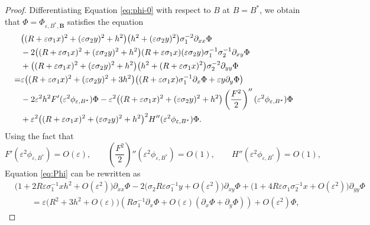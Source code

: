 \documentclass[12pt,reqno]{amsart}
\numberwithin{equation}{section}
\theoremstyle{definition}
\theoremstyle{remark}
\begin{document}
\begin{proof}
 

Differentiating Equation \eqref{eq:phi-0}  with respect to $ B $ at $ B = B^* $, we obtain that
$ \Phi=\Phi_{\varepsilon,B^*,\mathbf{B}} $ satisfies the equation 
 \begin{align}\label{eq:Phi}
 &\bigl((R+\varepsilon\sigma_1x)^2+(\varepsilon\sigma_2y)^2+h^2\bigr)\bigl(h^2+(\varepsilon\sigma_2y)^2\bigr)\sigma_1^{-2}\partial_{xx}\Phi \notag\\
 &  -2\bigl((R+\varepsilon\sigma_1x)^2+(\varepsilon\sigma_2y)^2+h^2\bigr)(R+\varepsilon\sigma_1x)(\varepsilon\sigma_2y)
 \sigma_1^{-1}\sigma_2^{-1}\partial_{xy}\Phi \notag\\
 & +\bigl((R+\varepsilon\sigma_1x)^2+(\varepsilon\sigma_2y)^2+h^2\bigr)\bigl(h^2+(R+\varepsilon\sigma_1x)^2\bigr)\sigma_2^{-2}\partial_{yy}\Phi \notag\\
 =&\varepsilon\bigl((R+\varepsilon\sigma_1x)^2+(\varepsilon\sigma_2y)^2+3h^2\bigr)\bigl((R+\varepsilon\sigma_1x)\sigma_1^{-1}\partial_x\Phi+\varepsilon y\partial_y\Phi\bigr)\notag\\
 &
 - 2\varepsilon^2h^2
 F'(\varepsilon^2\phi_{\varepsilon,B^*})\Phi-\varepsilon^2\bigl((R+\varepsilon\sigma_1x)^2+(\varepsilon\sigma_2y)^2+h^2\bigr)
 \left(\frac{F^2}{2}\right)''(\varepsilon^2\phi_{\varepsilon,B^*})\Phi \notag\\
 & +\varepsilon^2\bigl((R+\varepsilon\sigma_1x)^2+(\varepsilon\sigma_2y)^2+h^2\bigr)^2
 H''(\varepsilon^2\phi_{\varepsilon,B^*})\Phi.
 \end{align}
Using the fact that
\begin{equation*}\label{eq:low-regularity-FH}
F'(\varepsilon^2\phi_{\varepsilon,B^*})=O(\varepsilon),
\qquad \left(\frac{F^2}{2}\right)''(\varepsilon^2\phi_{\varepsilon,B^*})=O(1),
\qquad H''(\varepsilon^2\phi_{\varepsilon,B^*})=O(1),
\end{equation*}
Equation \eqref{eq:Phi} can be rewritten as 
\begin{equation*}\label{eq:Phi-expanded-coefficients}
\begin{split}
&\bigl(1+2R\varepsilon\sigma_1^{-1}xh^2+O(\varepsilon^2)\bigr)\partial_{xx}\Phi
-2\bigl(\sigma_2R\varepsilon\sigma_1^{-1}y+O(\varepsilon^2)\bigr)\partial_{xy}\Phi
+\bigl(1+4R\varepsilon\sigma_1\sigma_2^{-1}x+O(\varepsilon^2)\bigr)\partial_{yy}\Phi\\
&\qquad=\varepsilon\bigl(R^2+3h^2+O(\varepsilon)\bigr)\left( R\sigma_1^{-1}\partial_x\Phi
+O(\varepsilon)(\partial_x\Phi+\partial_y\Phi)\right) +O(\varepsilon^2)\Phi,

\end{split}
\end{equation*}
\end{proof}
\end{document}
